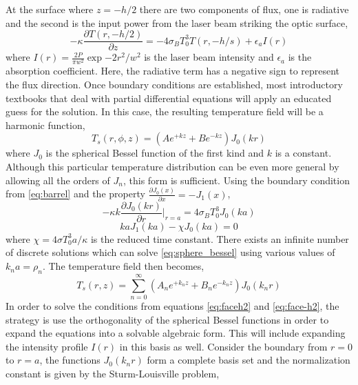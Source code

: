 	At the surface where $z=-h/2$ there are two components of flux, one is radiative and the second is the input power from the laser beam striking the optic surface,
	\begin{equation}\label{eq:face-h2}
		-\kappa \frac{\partial T(r,-h/2)}{\partial z} =  -4 \sigma_B T_0^3 T(r,-h/s) + \epsilon_a I(r)
	\end{equation}
	where $I(r) = \frac{2P}{\pi w^2} \exp{-2r^2/w^2}$ is the laser beam intensity and $\epsilon_a$ is the absorption coefficient.  Here, the radiative term has a negative sign to represent the flux direction. Once boundary conditions are established,  most introductory textbooks that deal with partial differential equations will apply an educated guess for the solution.  In this case, the resulting temperature field will be a harmonic function,
	\begin{equation}
	T_s(r,\phi,z) =  (A e^{+k z} + B e^{-kz}) J_0(kr)
	\end{equation}
	where $J_0$ is the spherical Bessel function of the first kind and $k$ is a constant.  Although this particular temperature distribution can be even more general by allowing all the orders of $J_n$, this form is sufficient. Using the boundary condition from \ref{eq:barrel} and the property $\frac{\partial J_0(x)}{\partial x} = -J_1(x)$,
	\begin{equation}
		-\kappa k \frac{\partial J_0(kr)}{\partial r} \bigg\vert_{r=a} = 4 \sigma_B T_0^3 J_0(ka)
	\end{equation}
	\begin{equation}\label{eq:sphere_bessel}
		ka J_1(ka) - \chi J_0(ka)=0
	\end{equation}
	where $\chi = 4\sigma T_0^3 a/\kappa$ is the reduced time constant.  There exists an infinite number of discrete solutions which can solve \ref{eq:sphere_bessel} using various values of $k_n a = \rho_n$.
	The temperature field then becomes,
	\begin{equation}\label{eq:temp2}
	T_s(r,z) = \sum_{n=0}^{\infty} (A_n e^{+k_n z} + B_n e^{-k_n z}) J_0(k_n r)
	\end{equation}
	In order to solve the conditions from equations \ref{eq:faceh2} and \ref{eq:face-h2}, the strategy is use the orthogonality of the spherical Bessel functions in order to expand the equations into a solvable algebraic form.  This will include expanding the intensity profile $I(r)$ in this basis as well.  Consider the boundary from $r=0$ to $r=a$, the functions $J_0(k_n r)$ form a complete basis set and the normalization constant is given by the Sturm-Louisville problem,
